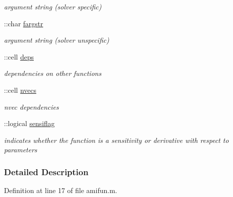 \begin{DoxyCompactItemize}
\begin{DoxyCompactList}\small\item\em argument string (solver specific) \end{DoxyCompactList}\item 
\hypertarget{classamifun_acdb54dfb4e0a737dba0367c5958e779e}{}\+::char \hyperlink{classamifun_acdb54dfb4e0a737dba0367c5958e779e}{fargstr}\label{classamifun_acdb54dfb4e0a737dba0367c5958e779e}

\begin{DoxyCompactList}\small\item\em argument string (solver unspecific) \end{DoxyCompactList}\item 
\hypertarget{classamifun_a69ffe5c24686ceb79ed44399e6be556c}{}\+::cell \hyperlink{classamifun_a69ffe5c24686ceb79ed44399e6be556c}{deps}\label{classamifun_a69ffe5c24686ceb79ed44399e6be556c}

\begin{DoxyCompactList}\small\item\em dependencies on other functions \end{DoxyCompactList}\item 
\hypertarget{classamifun_a019d960f3d1c1c819a7f3fc90f952c4b}{}\+::cell \hyperlink{classamifun_a019d960f3d1c1c819a7f3fc90f952c4b}{nvecs}\label{classamifun_a019d960f3d1c1c819a7f3fc90f952c4b}

\begin{DoxyCompactList}\small\item\em nvec dependencies \end{DoxyCompactList}\item 
\hypertarget{classamifun_ad8930a02bca1d5facc6203b722d5349d}{}\+::logical \hyperlink{classamifun_ad8930a02bca1d5facc6203b722d5349d}{sensiflag}\label{classamifun_ad8930a02bca1d5facc6203b722d5349d}

\begin{DoxyCompactList}\small\item\em indicates whether the function is a sensitivity or derivative with respect to parameters \end{DoxyCompactList}\end{DoxyCompactItemize}


\subsubsection{Detailed Description}


Definition at line 17 of file amifun.\+m.



